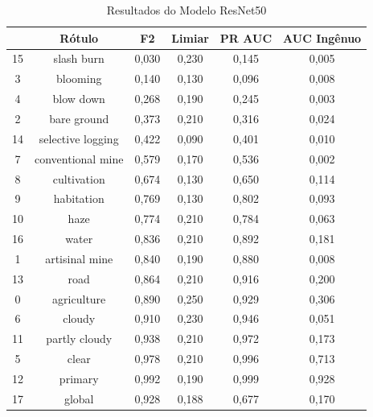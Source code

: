 \begin{table}[h!]
    \caption{Resultados do Modelo ResNet50}
    \centering
\begin{tabular}{*{6}{c}}
    \toprule
    {} &              Rótulo &  F2    &  Limiar   &  PR AUC &  AUC Ingênuo \\
    \midrule
    15 &         slash burn &  0,030 &      0,230 &   0,145 &       0,005 \\
    3  &           blooming &  0,140 &      0,130 &   0,096 &       0,008 \\
    4  &          blow down &  0,268 &      0,190 &   0,245 &       0,003 \\
    2  &        bare ground &  0,373 &      0,210 &   0,316 &       0,024 \\
    14 &  selective logging &  0,422 &      0,090 &   0,401 &       0,010 \\
    7  &  conventional mine &  0,579 &      0,170 &   0,536 &       0,002 \\
    8  &        cultivation &  0,674 &      0,130 &   0,650 &       0,114 \\
    9  &         habitation &  0,769 &      0,130 &   0,802 &       0,093 \\
    10 &               haze &  0,774 &      0,210 &   0,784 &       0,063 \\
    16 &              water &  0,836 &      0,210 &   0,892 &       0,181 \\
    1  &     artisinal mine &  0,840 &      0,190 &   0,880 &       0,008 \\
    13 &               road &  0,864 &      0,210 &   0,916 &       0,200 \\
    0  &        agriculture &  0,890 &      0,250 &   0,929 &       0,306 \\
    6  &             cloudy &  0,910 &      0,230 &   0,946 &       0,051 \\
    11 &      partly cloudy &  0,938 &      0,210 &   0,972 &       0,173 \\
    5  &              clear &  0,978 &      0,210 &   0,996 &       0,713 \\
    12 &            primary &  0,992 &      0,190 &   0,999 &       0,928 \\
    17 &             global &  0,928 &      0,188 &   0,677 &       0,170 \\
    \bottomrule
\end{tabular}
\label{table:ResultadosResnet50}
\end{table}


